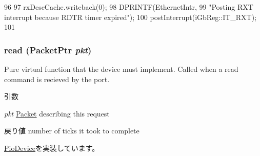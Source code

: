\begin{DoxyCode}
96                        {
97         rxDescCache.writeback(0);
98         DPRINTF(EthernetIntr,
99                 "Posting RXT interrupt because RDTR timer expired\n");
100         postInterrupt(iGbReg::IT_RXT);
101     }
\end{DoxyCode}
\hypertarget{classIGbE_a613ec7d5e1ec64f8d21fec78ae8e568e}{
\subsubsection[{read}]{ read ({\bf PacketPtr} {\em pkt})}}
\label{classIGbE_a613ec7d5e1ec64f8d21fec78ae8e568e}
Pure virtual function that the device must implement. Called when a read command is recieved by the port. 
\begin{DoxyParams}{引数}
\item[{\em pkt}]\hyperlink{classPacket}{Packet} describing this request \end{DoxyParams}
\begin{DoxyReturn}{戻り値}
number of ticks it took to complete 
\end{DoxyReturn}


\hyperlink{classPioDevice_a842312590432036092c422c87a442358}{PioDevice}を実装しています。


